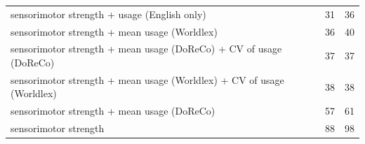 \begin{table}[ht]
\begin{tabular}{lrr}
  sensorimotor strength + usage (English only) & 31 & 36 \\ 
  sensorimotor strength + mean usage (Worldlex) & 36 & 40 \\ 
  sensorimotor strength + mean usage (DoReCo) + CV of usage (DoReCo) & 37 & 37 \\ 
  sensorimotor strength + mean usage (Worldlex) + CV of usage (Worldlex) & 38 & 38 \\ 
  sensorimotor strength + mean usage (DoReCo) & 57 & 61 \\ 
  sensorimotor strength & 88 & 98 \\ 
   \hline
\end{tabular}
\end{table}
